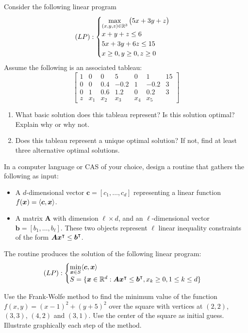 \begin{problem}[Intermediate]
Consider the following linear program
\begin{equation*}
(LP): \begin{cases}
\displaystyle{\max_{(x,y,z) \in \mathbb{R}^3} \big( 5x+3y+z \big)} \\
x+y+z \leq 6 \\
5x+3y+6z \leq 15 \\
x \geq 0, y \geq 0, z \geq 0
\end{cases}
\end{equation*}
Assume the following is an associated tableau:
\begin{equation*}
\begin{bmatrix}
1 &   0 &   0 &    5 &   0 &   1  & 15 \\
0 &   0 & 0.4 & -0.2 &   1 & -0.2 &  3 \\
0 &   1 & 0.6 &  1.2 &   0 &  0.2 &  3 \\ \hline
z & x_1 & x_2 &  x_3 & x_4 &  x_5  
\end{bmatrix}
\end{equation*}
\begin{enumerate}
\item What basic solution does this tableau represent? Is this solution optimal? Explain why or why not.
\item Does this tableau represent a unique optimal solution? If not, find at least three alternative optimal solutions.
\end{enumerate}
\end{problem}

\begin{problem}[CAS]
In a computer language or CAS of your choice, design a routine that gathers the following as input:
\begin{itemize}
	\item A $d$-dimensional vector $\boldsymbol{c}=[c_1, \dotsc, c_d]$ representing a linear function $f(\boldsymbol{x}) = \langle \boldsymbol{c}, \boldsymbol{x} \rangle$.
	\item A matrix $\boldsymbol{A}$ with dimension $\ell \times d$, and an $\ell$-dimensional vector $\boldsymbol{b} = [b_1, \dotsc, b_\ell]$.  These two objects represent $\ell$ linear inequality constraints of the form $\boldsymbol{A}{\boldsymbol{x}}^\intercal \leq {\boldsymbol{b}}^\intercal$. 
\end{itemize}
The routine produces the solution of the following linear program:
\begin{equation*}
(LP): \begin{cases} \displaystyle{\min_{\boldsymbol{x}\in S} \langle \boldsymbol{c}, \boldsymbol{x}\rangle} \\ S = \{ \boldsymbol{x} \in \mathbb{R}^d : \boldsymbol{A}{\boldsymbol{x}}^\intercal \leq {\boldsymbol{b}}^\intercal, x_k \geq 0, 1 \leq k \leq d \} \end{cases}
\end{equation*}
\end{problem}

\begin{problem}[Basic]
Use the Frank-Wolfe method to find the minimum value of the function $f(x,y)=(x-1)^2+(y+5)^2$ over the square with vertices at $(2,2)$, $(3,3)$, $(4,2)$ and $(3,1)$. Use the center of the square as initial guess.  Illustrate graphically each step of the method.
\end{problem}